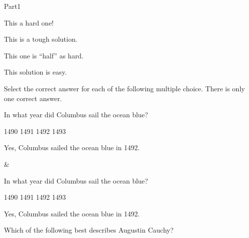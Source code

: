 \documentclass[12pt]{article}
\begin{document}
\begin{exam}[Part I.]{Part1}
\begin{problem*}[\auto]
\begin{parts}

\item {} This a hard one!

\begin{solution}[.75in]
This is a tough solution.
\end{solution}

\item {} This one is ``half'' as hard.

\begin{solution}[\sameVspace]
This solution is easy.
\end{solution}

\end{parts}
\end{problem*}



\begin{problem*}[\auto] \sqForms
Select the correct answer for each of the following multiple
choice. There is only one correct answer.
\begin{parts}[2]

    \item{} In what year did Columbus sail the ocean blue?
    \begin{answers}{2} %
    \bChoices
         1490\eAns
         1491\eAns
         1492\eAns
         1493\eAns
    \eChoices
    \end{answers}
\begin{solution}
    Yes, Columbus sailed the ocean blue in 1492.
\end{solution}
&%
    \item{} In what year did Columbus sail the ocean blue?
    \begin{answers}{1} %
    \bChoices
         1490\eAns
         1491\eAns
         1492\eAns
         1493\eAns
    \eChoices
    \end{answers}
\begin{solution}
    Yes, Columbus sailed the ocean blue in 1492.
\end{solution}
\end{parts}
\end{problem*}


\begin{problem}[5]
Which of the following best describes Augustin Cauchy?

\sqForms %


\end{problem}
\end{exam}
\end{document}
